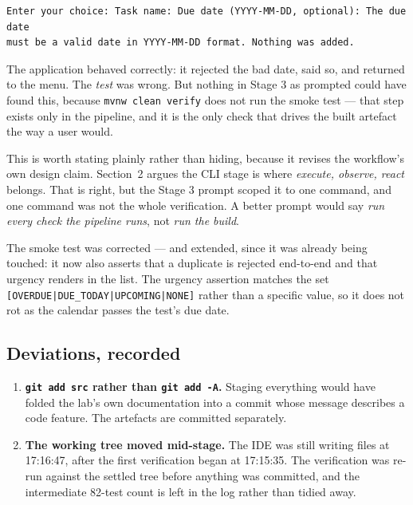 \documentclass[11pt,a4paper]{article}
\newcommand{\code}[1]{\texttt{\small #1}}
\begin{document}
\begin{lstlisting}[style=plain]
Enter your choice: Task name: Due date (YYYY-MM-DD, optional): The due date
must be a valid date in YYYY-MM-DD format. Nothing was added.
\end{lstlisting}

\noindent The application behaved correctly: it rejected the bad date, said so,
and returned to the menu. The \emph{test} was wrong. But nothing in Stage 3 as
prompted could have found this, because \code{mvnw clean verify} does not run
the smoke test --- that step exists only in the pipeline, and it is the only
check that drives the built artefact the way a user would.

This is worth stating plainly rather than hiding, because it revises the
workflow's own design claim. Section~2 argues the CLI stage is where
\emph{execute, observe, react} belongs. That is right, but the Stage 3 prompt
scoped it to one command, and one command was not the whole verification. A
better prompt would say \emph{run every check the pipeline runs}, not
\emph{run the build}.

The smoke test was corrected --- and extended, since it was already being
touched: it now also asserts that a duplicate is rejected end-to-end and that
urgency renders in the list. The urgency assertion matches the set
\code{[OVERDUE|DUE\_TODAY|UPCOMING|NONE]} rather than a specific value, so it
does not rot as the calendar passes the test's due date.

\subsection{Deviations, recorded}

\begin{enumerate}
  \item \textbf{\code{git add src} rather than \code{git add -A}.} Staging
        everything would have folded the lab's own documentation into a commit
        whose message describes a code feature. The artefacts are committed
        separately.
  \item \textbf{The working tree moved mid-stage.} The IDE was still writing
        files at 17:16:47, after the first verification began at 17:15:35. The
        verification was re-run against the settled tree before anything was
        committed, and the intermediate 82-test count is left in the log rather
        than tidied away.
\end{enumerate}
\end{document}
